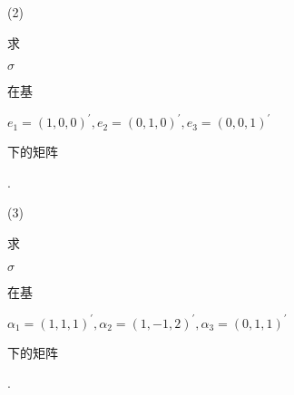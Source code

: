 \documentclass[10pt]{article}
\begin{document}
(2) \begin{CJK}{UTF8}{mj}求\end{CJK} $\sigma$ \begin{CJK}{UTF8}{mj}在基\end{CJK} $e_{1}=(1,0,0)^{\prime}, e_{2}=(0,1,0)^{\prime}, e_{3}=(0,0,1)^{\prime}$ \begin{CJK}{UTF8}{mj}下的矩阵\end{CJK}.

(3) \begin{CJK}{UTF8}{mj}求\end{CJK} $\sigma$ \begin{CJK}{UTF8}{mj}在基\end{CJK} $\alpha_{1}=(1,1,1)^{\prime}, \alpha_{2}=(1,-1,2)^{\prime}, \alpha_{3}=(0,1,1)^{\prime}$ \begin{CJK}{UTF8}{mj}下的矩阵\end{CJK}.
\end{document}
